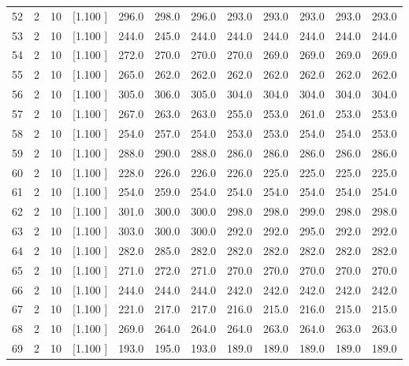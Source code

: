 \documentclass[12pt,a4paper]{article}
\begin{document}
\begin{center}
{\begin{tabular}{r r r r r r r r r r r r}
  52&  2& 10&[1.100     ]&   296.0&   298.0&   296.0&   293.0&   293.0&   293.0&   293.0&   293.0\\[-0.02in]
  53&  2& 10&[1.100     ]&   244.0&   245.0&   244.0&   244.0&   244.0&   244.0&   244.0&   244.0\\[-0.02in]
  54&  2& 10&[1.100     ]&   272.0&   270.0&   270.0&   270.0&   269.0&   269.0&   269.0&   269.0\\[-0.02in]
  55&  2& 10&[1.100     ]&   265.0&   262.0&   262.0&   262.0&   262.0&   262.0&   262.0&   262.0\\[-0.02in]
  56&  2& 10&[1.100     ]&   305.0&   306.0&   305.0&   304.0&   304.0&   304.0&   304.0&   304.0\\[-0.02in]
  57&  2& 10&[1.100     ]&   267.0&   263.0&   263.0&   255.0&   253.0&   261.0&   253.0&   253.0\\[-0.02in]
  58&  2& 10&[1.100     ]&   254.0&   257.0&   254.0&   253.0&   253.0&   254.0&   254.0&   253.0\\[-0.02in]
  59&  2& 10&[1.100     ]&   288.0&   290.0&   288.0&   286.0&   286.0&   286.0&   286.0&   286.0\\[-0.02in]
  60&  2& 10&[1.100     ]&   228.0&   226.0&   226.0&   226.0&   225.0&   225.0&   225.0&   225.0\\[-0.02in]
  61&  2& 10&[1.100     ]&   254.0&   259.0&   254.0&   254.0&   254.0&   254.0&   254.0&   254.0\\[-0.02in]
  62&  2& 10&[1.100     ]&   301.0&   300.0&   300.0&   298.0&   298.0&   299.0&   298.0&   298.0\\[-0.02in]
  63&  2& 10&[1.100     ]&   303.0&   300.0&   300.0&   292.0&   292.0&   295.0&   292.0&   292.0\\[-0.02in]
  64&  2& 10&[1.100     ]&   282.0&   285.0&   282.0&   282.0&   282.0&   282.0&   282.0&   282.0\\[-0.02in]
  65&  2& 10&[1.100     ]&   271.0&   272.0&   271.0&   270.0&   270.0&   270.0&   270.0&   270.0\\[-0.02in]
  66&  2& 10&[1.100     ]&   244.0&   244.0&   244.0&   242.0&   242.0&   242.0&   242.0&   242.0\\[-0.02in]
  67&  2& 10&[1.100     ]&   221.0&   217.0&   217.0&   216.0&   215.0&   216.0&   215.0&   215.0\\[-0.02in]
  68&  2& 10&[1.100     ]&   269.0&   264.0&   264.0&   264.0&   263.0&   264.0&   263.0&   263.0\\[-0.02in]
  69&  2& 10&[1.100     ]&   193.0&   195.0&   193.0&   189.0&   189.0&   189.0&   189.0&   189.0\\[-0.02in]

\end{tabular}}
\end{center}
\end{document}
